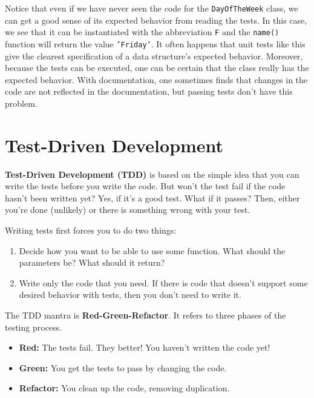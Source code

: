 Notice that even if we have never seen the code for the \texttt{DayOfTheWeek} class, we can get a good sense of its expected behavior from reading the tests.  In this case, we see that it can be instantiated with the abbreviation \texttt{F} and the \texttt{name()} function will return the value \texttt{'Friday'}.  It often happens that unit tests like this give the clearest specification of a data structure’s expected behavior.  Moreover, because the tests can be executed, one can be certain that the class really has the expected behavior.  With documentation, one sometimes finds that changes in the code are not reflected in the documentation, but passing tests don’t have this problem.

\section{Test-Driven Development}


\textbf{Test-Driven Development (TDD)} is based on the simple idea that you can write the tests before you write the code.  But won’t the test fail if the code hasn’t been written yet?  Yes, if it’s a good test.  What if it passes?  Then, either you’re done (unlikely) or there is something wrong with your test.


Writing tests first forces you to do two things:

\begin{enumerate}

\item Decide how you want to be able to use some function.  What should the parameters be?  What should it return?

\item Write only the code that you need.  If there is code that doesn’t support some desired behavior with tests, then you don’t need to write it.

\end{enumerate}

The TDD mantra is \textbf{Red-Green-Refactor}.  It refers to three phases of the testing process.

\begin{itemize}

\item \textbf{Red:} The tests fail.  They better!  You haven’t written the code yet!

\item \textbf{Green:} You get the tests to pass by changing the code.

\item \textbf{Refactor:} You clean up the code, removing duplication.

\end{itemize}


